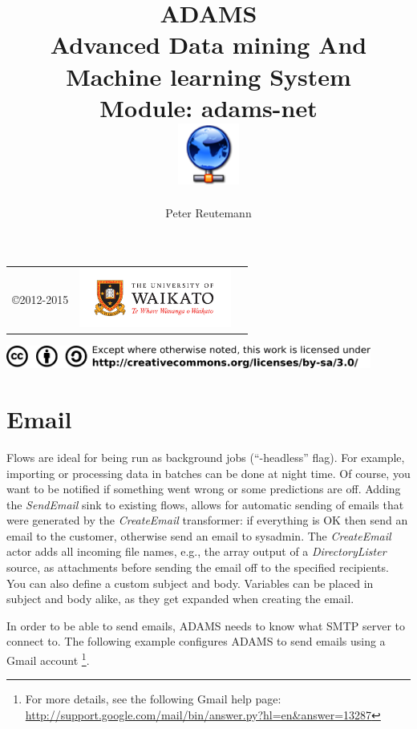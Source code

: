 \documentclass[a4paper]{book}
\title{
  \textbf{ADAMS} \\
  {\Large \textbf{A}dvanced \textbf{D}ata mining \textbf{A}nd \textbf{M}achine
  learning \textbf{S}ystem} \\
  {\Large Module: adams-net} \\
  \vspace{1cm}
  \includegraphics[width=2cm]{images/net-module.png} \\
}
\author{
  Peter Reutemann
}
\begin{document}
\begin{titlepage}
\maketitle

\thispagestyle{empty}
\center
\begin{table}[b]
	\begin{tabular}{c l l}
		\parbox[c][2cm]{2cm}{\copyright 2012-2015} &
		\parbox[c][2cm]{5cm}{\includegraphics[width=5cm]{images/coat_of_arms.pdf}} \\
	\end{tabular}
	\includegraphics[width=12cm]{images/cc.png} \\
\end{table}

\end{titlepage}

\tableofcontents
\listoffigures


\chapter{Email}
Flows are ideal for being run as background jobs (``-headless'' flag). For
example, importing or processing data in batches can be done at night time. 
Of course, you want to be notified if something went wrong or some predictions
are off. Adding the \textit{SendEmail} sink to existing flows, allows for automatic
sending of emails that were generated by the \textit{CreateEmail} transformer: 
if everything is OK then send an email to the customer,
otherwise send an email to sysadmin. The \textit{CreateEmail} actor adds all incoming
file names, e.g., the array output of a \textit{DirectoryLister} source, as
attachments before sending the email off to the specified recipients. You can
also define a custom subject and body. Variables can be placed in subject and
body alike, as they get expanded when creating the email.

In order to be able to send emails, ADAMS needs to know what SMTP server to
connect to. The following example configures ADAMS to send emails using a Gmail
account \footnote{For more details, see the following Gmail help page: \\
\url{http://support.google.com/mail/bin/answer.py?hl=en&answer=13287}{}}. 
\end{document}
